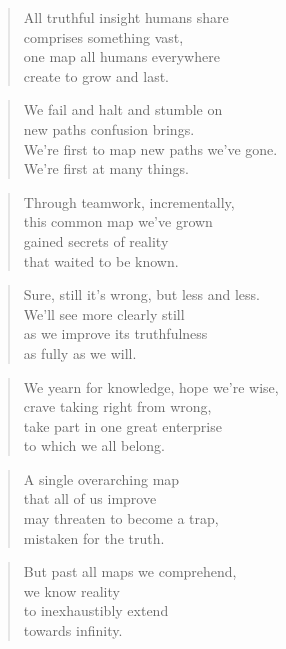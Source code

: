 \documentclass[14pt,a4paper]{article}
\begin{document}
\begin{verse}
All truthful insight humans share\\
comprises something vast,\\
one map all humans everywhere\\
create to grow and last.
\end{verse}

\begin{verse}
We fail and halt and stumble on\\
new paths confusion brings.\\
We’re first to map new paths we’ve gone.\\
We’re first at many things.
\end{verse}

\begin{verse}
Through teamwork, incrementally,\\
this common map we’ve grown\\
gained secrets of reality\\
that waited to be known.
\end{verse}

\begin{verse}
Sure, still it’s wrong, but less and less.\\
We’ll see more clearly still\\
as we improve its truthfulness\\
as fully as we will.
\end{verse}

\begin{verse}
We yearn for knowledge, hope we’re wise,\\
crave taking right from wrong,\\
take part in one great enterprise\\
to which we all belong.
\end{verse}

\begin{verse}
A single overarching map\\
that all of us improve\\
may threaten to become a trap,\\
mistaken for the truth.
\end{verse}

\begin{verse}
But past all maps we comprehend,\\
we know reality\\
to inexhaustibly extend\\
towards infinity.
\end{verse}
\end{document}
